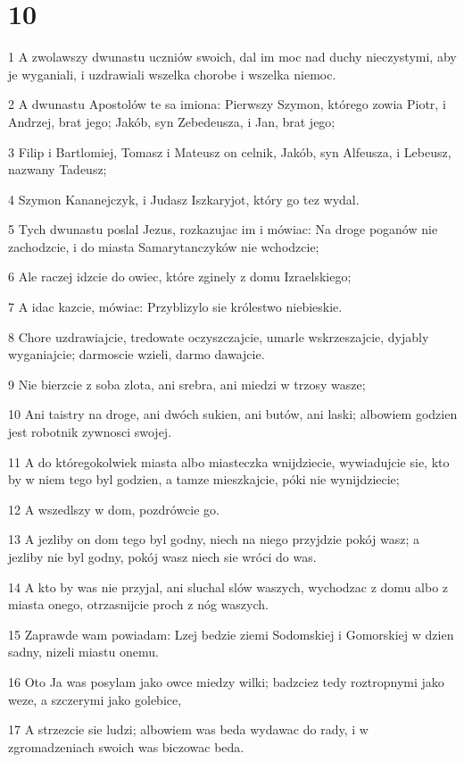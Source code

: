 \chapter{10}

\par 1 A zwolawszy dwunastu uczniów swoich, dal im moc nad duchy nieczystymi, aby je wyganiali, i uzdrawiali wszelka chorobe i wszelka niemoc.
\par 2 A dwunastu Apostolów te sa imiona: Pierwszy Szymon, którego zowia Piotr, i Andrzej, brat jego; Jakób, syn Zebedeusza, i Jan, brat jego;
\par 3 Filip i Bartlomiej, Tomasz i Mateusz on celnik, Jakób, syn Alfeusza, i Lebeusz, nazwany Tadeusz;
\par 4 Szymon Kananejczyk, i Judasz Iszkaryjot, który go tez wydal.
\par 5 Tych dwunastu poslal Jezus, rozkazujac im i mówiac: Na droge poganów nie zachodzcie, i do miasta Samarytanczyków nie wchodzcie;
\par 6 Ale raczej idzcie do owiec, które zginely z domu Izraelskiego;
\par 7 A idac kazcie, mówiac: Przyblizylo sie królestwo niebieskie.
\par 8 Chore uzdrawiajcie, tredowate oczyszczajcie, umarle wskrzeszajcie, dyjably wyganiajcie; darmoscie wzieli, darmo dawajcie.
\par 9 Nie bierzcie z soba zlota, ani srebra, ani miedzi w trzosy wasze;
\par 10 Ani taistry na droge, ani dwóch sukien, ani butów, ani laski; albowiem godzien jest robotnik zywnosci swojej.
\par 11 A do któregokolwiek miasta albo miasteczka wnijdziecie, wywiadujcie sie, kto by w niem tego byl godzien, a tamze mieszkajcie, póki nie wynijdziecie;
\par 12 A wszedlszy w dom, pozdrówcie go.
\par 13 A jezliby on dom tego byl godny, niech na niego przyjdzie pokój wasz; a jezliby nie byl godny, pokój wasz niech sie wróci do was.
\par 14 A kto by was nie przyjal, ani sluchal slów waszych, wychodzac z domu albo z miasta onego, otrzasnijcie proch z nóg waszych.
\par 15 Zaprawde wam powiadam: Lzej bedzie ziemi Sodomskiej i Gomorskiej w dzien sadny, nizeli miastu onemu.
\par 16 Oto Ja was posylam jako owce miedzy wilki; badzciez tedy roztropnymi jako weze, a szczerymi jako golebice,
\par 17 A strzezcie sie ludzi; albowiem was beda wydawac do rady, i w zgromadzeniach swoich was biczowac beda.

